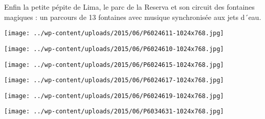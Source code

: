  Enfin la petite pépite de Lima, le parc de la Reserva et son circuit des fontaines magiques : un parcours de 13 fontaines avec musique synchronisée aux jets d´eau. \newline
 \newline
\centerline{\texttt{[image: ../wp-content/uploads/2015/06/P6024611-1024x768.jpg]} } 
 \newline
 \newline
\centerline{\texttt{[image: ../wp-content/uploads/2015/06/P6024610-1024x768.jpg]} } 
 \newline
 \newline
\centerline{\texttt{[image: ../wp-content/uploads/2015/06/P6024615-1024x768.jpg]} } 
 \newline
 \newline
\centerline{\texttt{[image: ../wp-content/uploads/2015/06/P6024617-1024x768.jpg]} } 
 \newline
 \newline
\centerline{\texttt{[image: ../wp-content/uploads/2015/06/P6024619-1024x768.jpg]} } 
 \newline
 \newline
\centerline{\texttt{[image: ../wp-content/uploads/2015/06/P6034631-1024x768.jpg]} } 
 \newline

\newpage
 
